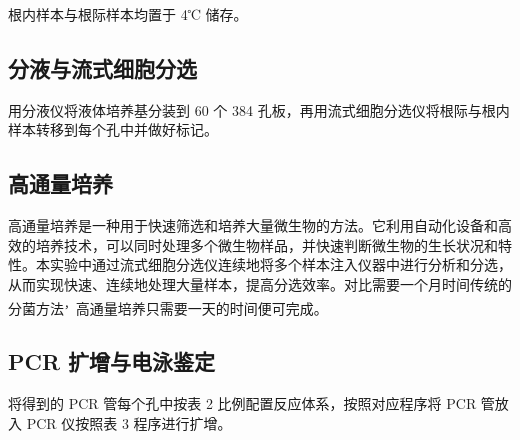 \documentclass[UTF8]{ctexart}
\begin{document}
        根内样本与根际样本均置于 4℃ 储存。

    \subsection{分液与流式细胞分选}

    用分液仪将液体培养基分装到 60 个 384 孔板，再用流式细胞分选仪将根际与根内样本转移到每个孔中并做好标记。

    \subsection{高通量培养}
    高通量培养是一种用于快速筛选和培养大量微生物的方法。它利用自动化设备和高效的培养技术，可以同时处理多个微生物样品，并快速判断微生物的生长状况和特性。本实验中通过流式细胞分选仪连续地将多个样本注入仪器中进行分析和分选，从而实现快速、连续地处理大量样本，提高分选效率。对比需要一个月时间传统的分菌方法\textsuperscript，高通量培养只需要一天的时间便可完成。

    \subsection{PCR 扩增与电泳鉴定}
        将得到的 PCR 管每个孔中按表 2 比例配置反应体系，按照对应程序将 PCR 管放入 PCR 仪按照表 3 程序进行扩增。
\end{document}
